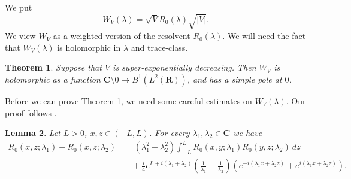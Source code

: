 \documentclass[12pt]{report}
\newcommand{\RR}{\mathbf{R}}
\newcommand{\CC}{\mathbf{C}}
\newtheorem{theorem}{Theorem}[chapter]
\newtheorem{lemma}[theorem]{Lemma}
\theoremstyle{definition}
\begin{document}
We put
$$W_V(\lambda) = \sqrt VR_0(\lambda)\sqrt{|V|}.$$
We view $W_V$ as a weighted version of the resolvent $R_0(\lambda)$.
We will need the fact that $W_V(\lambda)$ is holomorphic in $\lambda$ and trace-class.
\begin{theorem}
  \label{sv is b1 family}
Suppose that $V$ is super-exponentially decreasing. Then $W_V$ is holomorphic as a function $\CC \setminus 0 \to B^1(L^2(\RR))$, and has a simple pole at $0$.
\end{theorem}
Before we can prove Theorem \ref{sv is b1 family}, we need some careful estimates on $W_V(\lambda)$.
Our proof follows \cite[Lemma 3.1]{froese1997asymptotic}.

\begin{lemma}
Let $L > 0$, $x,z \in (-L, L)$. For every $\lambda_1,\lambda_2 \in \CC$ we have
\begin{align*}R_0(x, z; \lambda_1) - R_0(x, z; \lambda_2)
    &= (\lambda_1^2 - \lambda_2^2)\int_{-L}^L R_0(x, y; \lambda_1)R_0(y, z; \lambda_2) ~dz\\
    &\quad+\frac{i}{4}e^{L + i(\lambda_1 + \lambda_2)}\left(\frac{1}{\lambda_1} - \frac{1}{\lambda_2}\right)(e^{-i(\lambda_1x + \lambda_2z)} + e^{i(\lambda_1x + \lambda_2z)}).
\end{align*}
\end{lemma}
\end{document}
